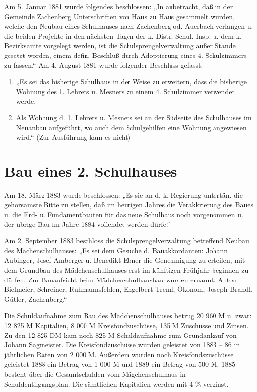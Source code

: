 \documentclass[12pt,a4paper]{book}
\begin{document}
Am 5. Januar 1881 wurde folgendes beschlossen: „In anbetracht, daß in der
Gemeinde Zachenberg Unterschriften von Haus zu Haus gesammelt wurden, welche den
Neubau eines Schulhauses nach Zachenberg od. Auerbach verlangen u. die beiden
Projekte in den nächsten Tagen der k. Distr.-Schul. Insp. u. dem k. Bezirksamte
vorgelegt werden, ist die Schulsprengelverwaltung außer Stande gesetzt worden,
einem defin. Beschluß durch Adoptierung eines 4. Schulzimmers zu fassen.“ Am 4.
August 1881 wurde folgender Beschluss gefasst:

\begin{enumerate}
\item „Es sei das bisherige Schulhaus in der Weise zu erweitern, dass die
bisherige Wohnung des 1. Lehrers u. Mesners zu einem 4. Schulzimmer verwendet
werde.

\item Als Wohnung d. 1. Lehrers u. Mesners sei an der Südseite des Schulhauses
im Neuanbau aufgeführt, wo auch dem Schulgehilfen eine Wohnung angewiesen wird.“
(Zur Ausführung kam es nicht)
\end{enumerate}

\section{Bau eines 2. Schulhauses}

Am 18. März 1883 wurde beschlossen: „Es sie an d. k. Regierung untertän. die
gehorsamste Bitte zu stellen, daß im heurigen Jahres die Verakkrierung des Baues
u. die Erd- u. Fundamentbauten für das neue Schulhaus noch vorgenommen u. der
übrige Bau im Jahre 1884 vollendet werden dürfe.“

Am 2. September 1883 beschloss die Schulsprengelverwaltung betreffend Neubau des
Mächenschulhauses: „Es sei dem Gesuche d. Bauakkordanten: Johann Aubinger, Josef
Amberger u. Benedikt Ebner die Genehmigung zu erteilen, mit dem Grundbau des
Mädchenschulhauses erst im künftigen Frühjahr beginnen zu dürfen. Zur
Bauaufsicht beim Mädchenschulhausbau wurden ernannt: Anton Bielmeier, Schreiner,
Ruhmannsfelden, Engelbert Treml, Ökonom, Joseph Brandl, Gütler, Zachenberg.“

Die Schuldaufnahme zum Bau des Mädchenschulhauses betrug 20 960 M u. zwar: 12
825 M Kapitalien, 8 000 M Kreisfondzuschüsse, 135 M Zuschüsse und Zinsen. Zu den
12 825 DM kam noch 825 M Schuldaufnahme zum Grundankauf von Johann Sagmeister.
Die Kreisfondzuschüsse wurden geleistet von 1883 – 86 in jährlichen Raten von 2
000 M. Außerdem wurden noch Kreisfondszuschüsse geleistet 1888 ein Betrag von 1
000 M und 1889 ein Betrag von 500 M. 1885 besteht über die Gesamtschulden vom
Mägchenschulhaus in Schuldentilgungsplan. Die sämtlichen Kapitalien werden mit 4
\% verzinst.
\end{document}
